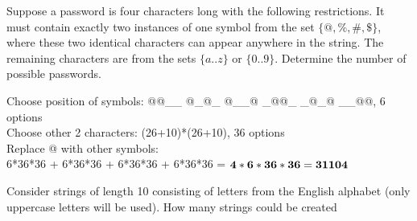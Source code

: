 \begin{questions}



 Suppose a password is four characters long with the following restrictions.  It must contain exactly two instances of one symbol from the set $\{ @, \%, \#, \$ \}$, where these two identical characters can appear anywhere in the string.  The remaining characters are from the sets $\{a..z \}$  or $\{ 0..9 \}$.  Determine the number of possible passwords.
  \ifprintanswers
        \vspace{-10pt}
    \fi
    \begin{solution}
      Choose position of symbols: @@\_\_ @\_@\_ @\_\_@ \_@@\_ \_@\_@ \_\_@@, 6 options \\
      Choose other 2 characters: (26+10)*(26+10), 36 options \\
      Replace @ with other symbols: \\
        6*36*36 + 6*36*36 + 6*36*36 + 6*36*36 = $\mathbf{4*6*36*36 = 31104}$
    \end{solution}




 Consider strings of length 10 consisting of letters from the English alphabet (only uppercase letters will be used).  How many strings could be created 
\end{questions}
